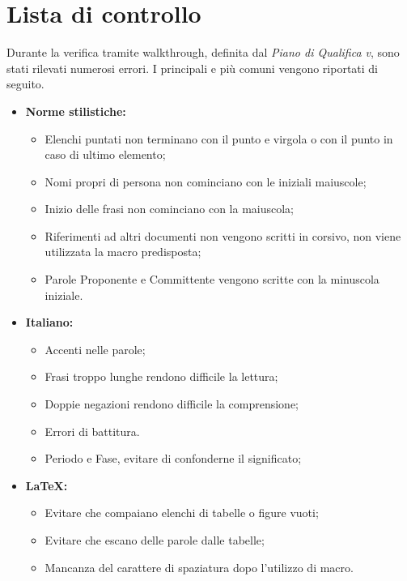 \section{Lista di controllo}
Durante la verifica tramite walkthrough, definita dal \emph{Piano di Qualifica v}\VersionePQ, sono stati rilevati numerosi errori. I principali e più comuni vengono riportati di seguito.
\begin{itemize}
\item \textbf{Norme stilistiche:}
\begin{itemize}
\item Elenchi puntati non terminano con il punto e virgola o con il punto in caso di ultimo elemento;
\item Nomi propri di persona non cominciano con le iniziali maiuscole;
\item Inizio delle frasi non cominciano con la maiuscola;
\item Riferimenti ad altri documenti non vengono scritti in corsivo, non viene utilizzata la macro predisposta;
\item Parole Proponente e Committente vengono scritte con la minuscola iniziale.
\end{itemize}

\item \textbf{Italiano:}
\begin{itemize}
\item Accenti nelle parole;
\item Frasi troppo lunghe rendono difficile la lettura;
\item Doppie negazioni rendono difficile la comprensione;
\item Errori di battitura.
\item Periodo e Fase, evitare di confonderne il significato;
\end{itemize}

\item \textbf{\LaTeX{}: }
\begin{itemize}
\item Evitare che compaiano elenchi di tabelle o figure vuoti;
\item Evitare che escano delle parole dalle tabelle;
\item Mancanza del carattere di spaziatura dopo l'utilizzo di macro.
\end{itemize}

\end{itemize}